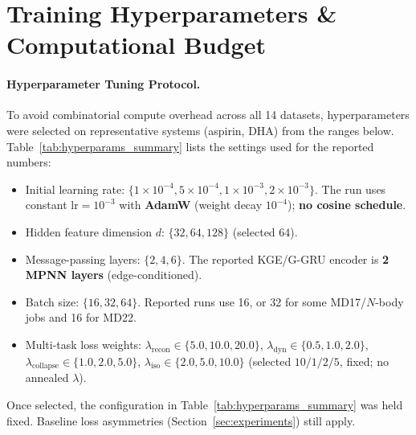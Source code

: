 \documentclass{article}
\newcommand{\GKE}{\textsc{KGE}}
\newcommand{\GGRU}{\textsc{G-GRU}}
\begin{document}
\clearpage
\section{Training Hyperparameters \& Computational Budget}
\label{app:hyperparams}

\paragraph{Hyperparameter Tuning Protocol.}
To avoid combinatorial compute overhead across all 14 datasets, hyperparameters were selected on representative systems (aspirin, DHA) from the ranges below. Table~\ref{tab:hyperparams_summary} lists the settings used for the reported numbers:
\begin{itemize}[leftmargin=1.5em,itemsep=1pt,topsep=1pt]
  \item Initial learning rate: $\{1\times 10^{-4}, 5\times 10^{-4}, 1\times 10^{-3}, 2\times 10^{-3}\}$. The run uses constant $\mathrm{lr}=10^{-3}$ with \textbf{AdamW} (weight decay $10^{-4}$); \textbf{no cosine schedule}.
  \item Hidden feature dimension $d$: $\{32, 64, 128\}$ (selected $64$).
  \item Message-passing layers: $\{2, 4, 6\}$. The reported \GKE{}/\GGRU{} encoder is \textbf{2 MPNN layers} (edge-conditioned).
  \item Batch size: $\{16, 32, 64\}$. Reported runs use 16, or 32 for some MD17/$N$-body jobs and 16 for MD22.
  \item Multi-task loss weights: $\lambda_{\text{recon}} \in \{5.0, 10.0, 20.0\}$, $\lambda_{\text{dyn}} \in \{0.5, 1.0, 2.0\}$, $\lambda_{\text{collapse}} \in \{1.0, 2.0, 5.0\}$, $\lambda_{\text{iso}} \in \{2.0, 5.0, 10.0\}$ (selected $10/1/2/5$, fixed; no annealed $\lambda$).
\end{itemize}
Once selected, the configuration in Table~\ref{tab:hyperparams_summary} was held fixed. Baseline loss asymmetries (Section~\ref{sec:experiments}) still apply.
\end{document}
